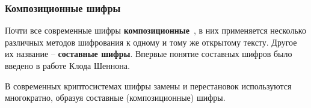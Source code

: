 \subsubsection{Композиционные шифры}

Почти все современные шифры \textbf{композиционные}~\cite{AlZKCh:2001}, в них применяется несколько различных методов шифрования к одному и тому же открытому тексту. Другое их название -- \textbf{составные шифры}. Впервые понятие составных шифров было введено в работе Клода Шеннона.

В современных криптосистемах шифры замены и перестановок используются многократно, образуя составные (композиционные) шифры.

